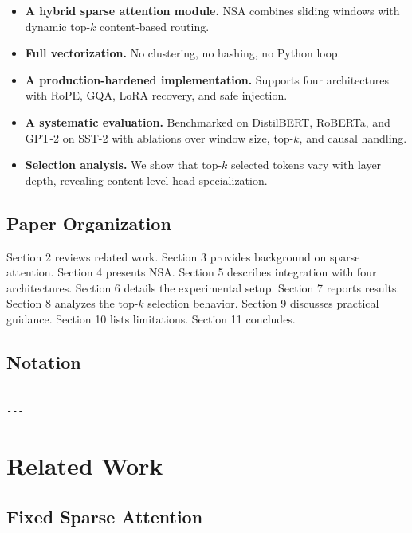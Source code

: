 \begin{itemize}
\item \textbf{A hybrid sparse attention module.} NSA combines sliding windows with
  dynamic top-$k$ content-based routing.
\item \textbf{Full vectorization.} No clustering, no hashing, no Python loop.
\item \textbf{A production-hardened implementation.} Supports four architectures
  with RoPE, GQA, LoRA recovery, and safe injection.
\item \textbf{A systematic evaluation.} Benchmarked on DistilBERT, RoBERTa, and GPT-2
  on SST-2 with ablations over window size, top-$k$, and causal handling.
\item \textbf{Selection analysis.} We show that top-$k$ selected tokens vary with
  layer depth, revealing content-level head specialization.

\end{itemize}
\subsection{Paper Organization}

Section 2 reviews related work. Section 3 provides background on sparse 
attention. Section 4 presents NSA. Section 5 describes integration with four 
architectures. Section 6 details the experimental setup. Section 7 reports 
results. Section 8 analyzes the top-$k$ selection behavior. Section 9 
discusses practical guidance. Section 10 lists limitations. Section 11 
concludes.



\subsection{Notation}

\begin{lstlisting}

---
\end{lstlisting}


\section{Related Work}

\subsection{Fixed Sparse Attention}

